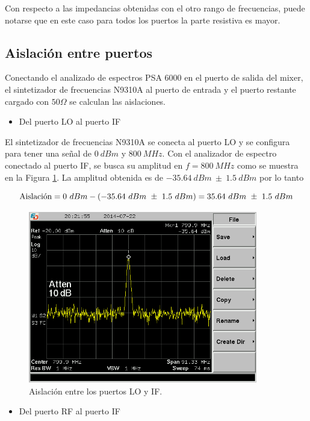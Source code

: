 \documentclass[a4paper,10pt]{article}
\begin{document}
	\indent Con respecto a las impedancias obtenidas con el otro rango de 
	frecuencias, puede notarse que en este caso para todos los puertos la parte 
	resistiva es mayor.
	
	\subsection{Aislación entre puertos}
	\indent Conectando el analizado de espectros PSA 6000 en el puerto de salida
	del mixer, el sintetizador de frecuencias N9310A al puerto de entrada y el 
	puerto restante cargado con $50\Omega$ se calculan las aislaciones.
	
	\begin{itemize}
		\item Del puerto LO al puerto IF
	\end{itemize}
	
	\indent El sintetizador de frecuencias N9310A se conecta al puerto LO y se 
	configura para tener una se\~nal de $0~dBm$ y $800~MHz$. Con el analizador 
	de espectro conectado al puerto IF, se busca su amplitud en $f=800~MHz$ como
	se muestra en la Figura \ref{isolation1fran}. La amplitud obtenida es de 
	$-35.64~dBm~\pm~1.5~dBm$ por lo tanto
	
	$$\textmd{Aislaci\'on}=0~dBm-(-35.64~dBm~\pm~1.5~dBm)=35.64~dBm~\pm~1.5~dBm$$
	
	\begin{figure}[!htb]
		\centering
		\includegraphics[width=10cm]{Images/SCREN531.png}
		\caption{Aislaci\'on entre los puertos LO y IF.}
		\label{isolation1fran}
	\end{figure}	
	
	\begin{itemize}
		\item Del puerto RF al puerto IF
	\end{itemize}
	
\end{document}
